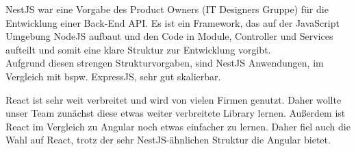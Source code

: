 NestJS war eine Vorgabe des Product Owners (IT Designers Gruppe) für die Entwicklung einer Back-End API. 
Es ist ein Framework, das auf der JavaScript Umgebung NodeJS aufbaut und den Code in Module, Controller und Services aufteilt und somit eine klare Struktur zur Entwicklung vorgibt.\\
Aufgrund diesen strengen Strukturvorgaben, sind NestJS Anwendungen, im Vergleich mit bspw. ExpressJS, sehr gut skalierbar.

\begin{table}[!h]
    \centering
    \end{table}

React ist sehr weit verbreitet und wird von vielen Firmen genutzt.
Daher wollte unser Team zunächst diese etwas weiter verbreitete Library lernen. 
Außerdem ist React im Vergleich zu Angular noch etwas einfacher zu lernen.
Daher fiel auch die Wahl auf React, trotz der sehr NestJS-ähnlichen Struktur die Angular bietet.


